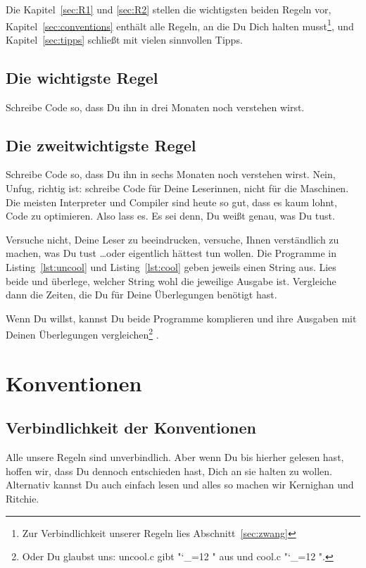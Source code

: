 \documentclass[twoside]{scrartcl}
\begin{document}
Die Kapitel~\ref{sec:R1} und \ref{sec:R2} stellen die wichtigsten beiden Regeln
vor, Kapitel~\ref{sec:conventions} enth\"a{}lt alle Regeln, an die Du Dich
halten musst\footnote{
  Zur Verbindlichkeit unserer Regeln lies Abschnitt~\ref{sec:zwang}
}, und Kapitel~\ref{sec:tipps} schlie\ss{}t mit vielen sinnvollen Tipps.

\subsection{Die wichtigste Regel\label{sec:R1}}
Schreibe Code so, dass Du ihn in drei Monaten noch verstehen wirst.

\subsection{Die zweitwichtigste Regel\label{sec:R2}}
Schreibe Code so, dass Du ihn in sechs Monaten noch verstehen wirst. Nein, 
Unfug, richtig ist: schreibe Code f\"u{}r Deine Leserinnen, nicht f\"u{}r die
Maschinen. Die meisten Interpreter und Compiler sind heute so gut, dass es
kaum lohnt, Code zu optimieren. Also lass es. Es sei denn, Du wei\ss{}t
genau, was Du tust. 

Versuche nicht, Deine Leser zu beeindrucken, versuche, Ihnen verst\"a{}ndlich zu
machen, was Du tust \ldots oder eigentlich h\"a{}ttest tun wollen.
Die Programme in  Listing~\ref{lst:uncool} und Listing~\ref{lst:cool} geben
jeweils einen String aus. Lies beide und
\"u{}berlege, welcher String wohl die jeweilige Ausgabe ist. Vergleiche dann die
Zeiten, die Du f\"u{}r Deine \"U{}berlegungen ben\"o{}tigt 
hast. 





Wenn Du willst, kannst Du  beide Programme komplieren und ihre Ausgaben mit
Deinen \"U{}berlegungen vergleichen\footnote{%
%
Oder Du glaubst uns: uncool.c gibt 
"\catcode`_=12 \ttfamily "
aus und cool.c 
"\catcode`_=12 \ttfamily ".
}%
. 

\section{Konventionen\label{sec:conventions}}
\subsection{Verbindlichkeit der Konventionen\label{sec:zwang}}
Alle unsere Regeln sind unverbindlich. Aber wenn Du bis hierher gelesen hast,
hoffen wir, dass Du dennoch entschieden hast, Dich an sie halten zu wollen.
Alternativ kannst Du auch einfach \cite{KR} lesen und alles so machen wir 
Kernighan und Ritchie.
\end{document}
